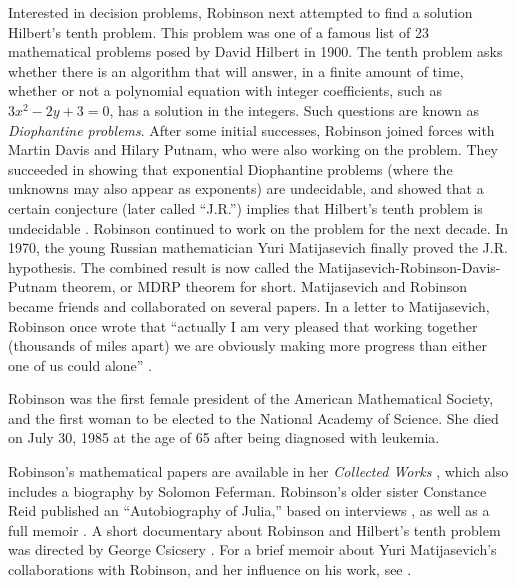 \documentclass[../../../include/open-logic-section]{subfiles}
\begin{document}
Interested in decision problems, Robinson next attempted to find a
solution Hilbert's tenth problem. This problem was one of a famous
list of 23 mathematical problems posed by David Hilbert in 1900. The
tenth problem asks whether there is an algorithm that will answer, in
a finite amount of time, whether or not a polynomial equation with
integer coefficients, such as $3x^2 - 2y +3 = 0$, has a solution in
the integers. Such questions are known as \emph{Diophantine
  problems}. After some initial successes, Robinson joined forces with
Martin Davis and Hilary Putnam, who were also working on the
problem. They succeeded in showing that exponential Diophantine
problems (where the unknowns may also appear as exponents) are
undecidable, and showed that a certain conjecture (later called
``J.R.'')  implies that Hilbert's tenth problem is undecidable
\citep{DavisPutnamRobinson1961}.  Robinson continued to work on the
problem for the next decade.  In 1970, the young Russian mathematician
Yuri Matijasevich finally proved the J.R. hypothesis.  The combined
result is now called the Matijasevich-Robinson-Davis-Putnam theorem,
or MDRP theorem for short.  Matijasevich and Robinson became friends
and collaborated on several papers. In a letter to Matijasevich,
Robinson once wrote that ``actually I am very pleased that working
together (thousands of miles apart) we are obviously making more
progress than either one of us could alone''
\citep[45]{Matijasevich1992}.

Robinson was the first female president of the American Mathematical
Society, and the first woman to be elected to the National
Academy of Science. She died on July 30, 1985 at the age of 65 after
being diagnosed with leukemia.

\begin{reading}
Robinson's mathematical papers are available in her \textit{Collected
  Works} \citep{Robinson1996}, which also includes a biography by
Solomon Feferman. Robinson's older sister Constance Reid published an
``Autobiography of Julia,'' based on interviews \citep{Reid1986}, as
well as a full memoir \citep{Reid1996}. A short documentary about
Robinson and Hilbert's tenth problem was directed by George Csicsery
\citep{Csicsery2016}. For a brief memoir about Yuri Matijasevich's
collaborations with Robinson, and her influence on his work, see
\citep{Matijasevich1992}.
\end{reading}
\end{document}
